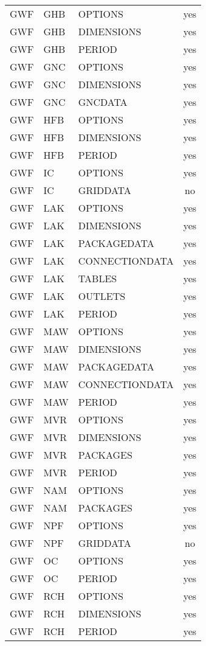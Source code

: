 \begin{longtable}{p{1.5cm} p{1.5cm} p{3cm} c}
\hline
GWF & GHB & OPTIONS & yes \\ 
GWF & GHB & DIMENSIONS & yes \\ 
GWF & GHB & PERIOD & yes \\ 
\hline
GWF & GNC & OPTIONS & yes \\ 
GWF & GNC & DIMENSIONS & yes \\ 
GWF & GNC & GNCDATA & yes \\ 
\hline
GWF & HFB & OPTIONS & yes \\ 
GWF & HFB & DIMENSIONS & yes \\ 
GWF & HFB & PERIOD & yes \\ 
\hline
GWF & IC & OPTIONS & yes \\ 
GWF & IC & GRIDDATA & no \\ 
\hline
GWF & LAK & OPTIONS & yes \\ 
GWF & LAK & DIMENSIONS & yes \\ 
GWF & LAK & PACKAGEDATA & yes \\ 
GWF & LAK & CONNECTIONDATA & yes \\ 
GWF & LAK & TABLES & yes \\ 
GWF & LAK & OUTLETS & yes \\ 
GWF & LAK & PERIOD & yes \\ 
\hline
GWF & MAW & OPTIONS & yes \\ 
GWF & MAW & DIMENSIONS & yes \\ 
GWF & MAW & PACKAGEDATA & yes \\ 
GWF & MAW & CONNECTIONDATA & yes \\ 
GWF & MAW & PERIOD & yes \\ 
\hline
GWF & MVR & OPTIONS & yes \\ 
GWF & MVR & DIMENSIONS & yes \\ 
GWF & MVR & PACKAGES & yes \\ 
GWF & MVR & PERIOD & yes \\ 
\hline
GWF & NAM & OPTIONS & yes \\ 
GWF & NAM & PACKAGES & yes \\ 
\hline
GWF & NPF & OPTIONS & yes \\ 
GWF & NPF & GRIDDATA & no \\ 
\hline
GWF & OC & OPTIONS & yes \\ 
GWF & OC & PERIOD & yes \\ 
\hline
GWF & RCH & OPTIONS & yes \\ 
GWF & RCH & DIMENSIONS & yes \\ 
GWF & RCH & PERIOD & yes \\ 

\end{longtable}

